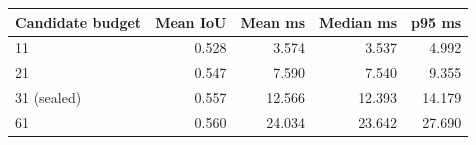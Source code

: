 \begin{tabular}{@{}lrrrr@{}}
\toprule
Candidate budget & Mean IoU & Mean ms & Median ms & p95 ms \\
\midrule
11 & 0.528 & 3.574 & 3.537 & 4.992 \\
21 & 0.547 & 7.590 & 7.540 & 9.355 \\
31 (sealed) & 0.557 & 12.566 & 12.393 & 14.179 \\
61 & 0.560 & 24.034 & 23.642 & 27.690 \\
\bottomrule
\end{tabular}
